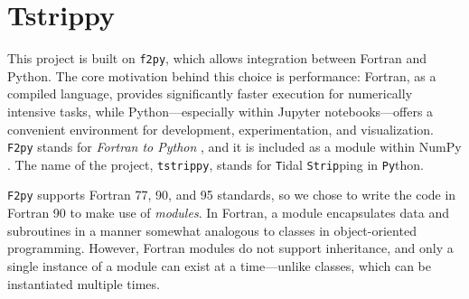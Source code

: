 \section{Tstrippy}
    This project is built on \texttt{f2py}, which allows integration between Fortran and Python. The core motivation behind this choice is performance: Fortran, as a compiled language, provides significantly faster execution for numerically intensive tasks, while Python—especially within Jupyter notebooks—offers a convenient environment for development, experimentation, and visualization. \texttt{F2py} stands for \textit{Fortran to Python} \citep{peterson2009f2py}, and it is included as a module within NumPy \citep{numpy_f2py_manual,2020Natur.585..357H}. The name of the project, \texttt{tstrippy}, stands for \texttt{T}idal \texttt{Strip}ping in \texttt{Py}thon.

    \texttt{F2py} supports Fortran 77, 90, and 95 standards, so we chose to write the code in Fortran 90 to make use of \textit{modules}. In Fortran, a module encapsulates data and subroutines in a manner somewhat analogous to classes in object-oriented programming. However, Fortran modules do not support inheritance, and only a single instance of a module can exist at a time—unlike classes, which can be instantiated multiple times.

